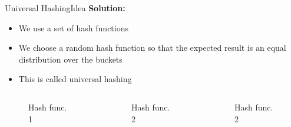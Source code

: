 \begin{frame}{Universal Hashing}{Idea}
  \textbf{Solution:}
  \begin{itemize}
    \setlength\itemsep{1.5em}
    \item <1->
      We use a set of hash functions
    \item <2->
      We choose a random hash function so that the {\color{Mittel-Blau}expected result} is an equal
      distribution over the buckets
    \item <3->
      This is called {\color{Mittel-Blau}universal hashing}
  \end{itemize}
  \begin{columns}
    \begin{column}{0.33\linewidth}
      \begin{figure}[!h]
        \begin{adjustbox}{height=0.8\linewidth}
          
        \end{adjustbox}
        \caption{Hash func. 1}
        \label{fig:universal_hashing:hash_function_crossing}
      \end{figure}
    \end{column}
    \begin{column}{0.33\linewidth}
      \begin{figure}[!h]
        \begin{adjustbox}{height=0.8\linewidth}
          
        \end{adjustbox}
        \caption{Hash func. 2}
        \label{fig:universal_hashing:hash_function_normal}
      \end{figure}
    \end{column}
    \begin{column}{0.33\linewidth}
      \begin{figure}[!h]
        \begin{adjustbox}{height=0.8\linewidth}
          
        \end{adjustbox}
        \caption{Hash func. 2}
        \label{fig:universal_hashing:hash_function_colliding}
      \end{figure}
    \end{column}
  \end{columns}
\end{frame}


